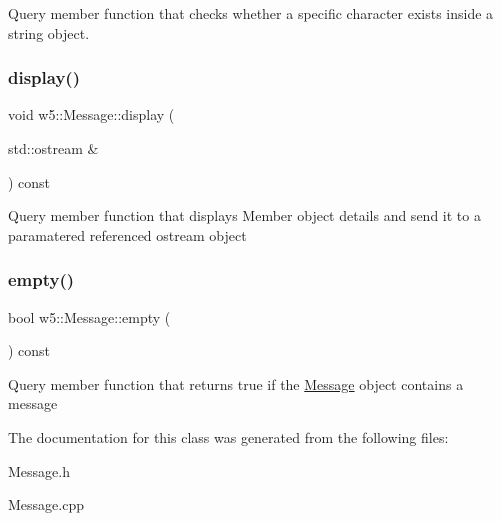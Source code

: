Query member function that checks whether a specific character exists inside a string object. \mbox{\label{classw5_1_1Message_a9d438129067f04a078ae309d89bebb25}} 
\subsubsection{\texorpdfstring{display()}{display()}}
{\footnotesize\ttfamily void w5\+::\+Message\+::display (\begin{DoxyParamCaption}\item[{std\+::ostream \&}]{ }\end{DoxyParamCaption}) const}

Query member function that displays Member object details and send it to a paramatered referenced ostream object \mbox{\label{classw5_1_1Message_aeeb54ee5ef1fd404dfbf0c7ff3f1cbf7}} 
\subsubsection{\texorpdfstring{empty()}{empty()}}
{\footnotesize\ttfamily bool w5\+::\+Message\+::empty (\begin{DoxyParamCaption}{ }\end{DoxyParamCaption}) const\hspace{0.3cm}{\ttfamily [inline]}}

Query member function that returns true if the \mbox{\hyperlink{classw5_1_1Message}{Message}} object contains a message 

The documentation for this class was generated from the following files\+:\begin{DoxyCompactItemize}
\item 
Message.\+h\item 
Message.\+cpp\end{DoxyCompactItemize}
